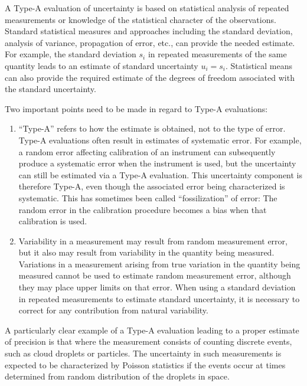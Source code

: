 \documentclass[12pt,twoside,english]{article}\usepackage[]{graphicx}\usepackage[]{color}
\let\OrgIndex\index
\renewcommand*{\index}[1]{\OrgIndex{#1}}
\begin{document}
A Type-A evaluation of uncertainty is based on statistical analysis of repeated measurements or knowledge of the statistical character of the observations. Standard statistical measures and approaches including the standard deviation, analysis of variance, propagation of error, etc., can provide the needed estimate. For example, the standard deviation $s_{i}$ in repeated measurements of the same quantity leads to an estimate of standard uncertainty  $u_{i}=s_{i}$. Statistical means can also provide the required estimate of the degrees of freedom associated with the standard uncertainty. 

Two important points need to be made in regard to Type-A evaluations:  
\begin{enumerate}
\item ``Type-A'' refers to how the estimate is obtained, not to the type of error. Type-A evaluations often result in estimates of systematic error. For example, a random error affecting calibration of an instrument can subsequently produce a systematic error when the instrument is used, but the uncertainty can still be estimated via a Type-A evaluation. This uncertainty component is therefore Type-A, even though the associated error being characterized is systematic. This has sometimes been called ``fossilization'' of error: The random error in the calibration procedure becomes a bias when that calibration is used.  
\item Variability in a measurement may result from random measurement error, but it also may result from variability in the quantity being measured. Variations in a measurement arising from true variation in the quantity being measured cannot be used to estimate random measurement error, although they may place upper limits on that error. When using a standard deviation in repeated measurements to estimate standard uncertainty, it is necessary to correct for any contribution from natural variability.  
\end{enumerate}
A particularly clear example of a Type-A evaluation leading to a proper estimate of precision is that where the measurement consists of counting discrete events, such as cloud droplets or particles. The uncertainty in such measurements is expected to be characterized by Poisson statistics if the events occur at times determined from random distribution of the droplets in space. 
\end{document}
